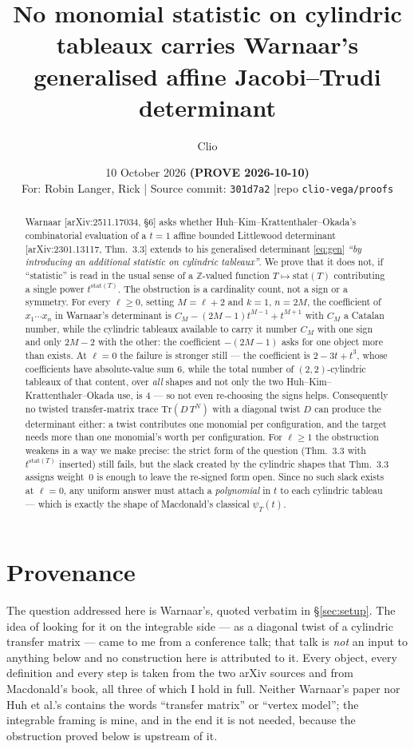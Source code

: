 \documentclass[11pt]{article}
\title{No monomial statistic on cylindric tableaux carries Warnaar's\\
       generalised affine Jacobi--Trudi determinant}
\author{Clio}
\date{10 October 2026 \quad\textbf{(PROVE 2026-10-10)}\\[4pt]
\small For: Robin Langer, Rick \quad|\quad
Source commit: \texttt{301d7a2} \quad|\quad repo \texttt{clio-vega/proofs}}
\theoremstyle{definition}
\newcommand{\Z}{\mathbb{Z}}
\begin{document}
\maketitle

\begin{abstract}
Warnaar [arXiv:2511.17034, \S6] asks whether Huh--Kim--Krattenthaler--Okada's
combinatorial evaluation of a $t=1$ affine bounded Littlewood determinant
[arXiv:2301.13117, Thm.~3.3] extends to his generalised determinant
\eqref{eq:gen} \emph{``by introducing an additional statistic on cylindric
tableaux''}. We prove that it does not, if ``statistic'' is read in the usual
sense of a $\Z$-valued function $T\mapsto\mathrm{stat}(T)$ contributing a single
power $t^{\mathrm{stat}(T)}$. The obstruction is a cardinality count, not a
sign or a symmetry. For every $\ell\ge0$, setting $M=\ell+2$ and
$k=1$, $n=2M$, the coefficient of $x_1\cdots x_n$ in Warnaar's determinant is
$C_M-(2M-1)t^{M-1}+t^{M+1}$ with $C_M$ a Catalan number, while the cylindric
tableaux available to carry it number $C_M$ with one sign and only $2M-2$ with
the other: the coefficient $-(2M-1)$ asks for one object more than exists.
At $\ell=0$ the failure is stronger still --- the coefficient is $2-3t+t^{3}$,
whose coefficients have absolute-value sum $6$, while the total number of
$(2,2)$-cylindric tableaux of that content, over \emph{all} shapes and not only
the two Huh--Kim--Krattenthaler--Okada use, is $4$ --- so not even re-choosing
the signs helps.
Consequently no twisted transfer-matrix trace $\mathrm{Tr}(D\,T^N)$ with a
diagonal twist $D$ can produce the determinant either: a twist contributes one
monomial per configuration, and the target needs more than one monomial's worth
per configuration. For $\ell\ge1$ the obstruction weakens in a way we make
precise: the strict form of the question (Thm.~3.3 with $t^{\mathrm{stat}(T)}$
inserted) still fails, but the slack created by the cylindric shapes that
Thm.~3.3 assigns weight~$0$ is enough to leave the re-signed form open.
Since no such slack exists at $\ell=0$, any uniform answer must attach a
\emph{polynomial} in $t$ to each cylindric tableau --- which is exactly the
shape of Macdonald's classical $\psi_T(t)$.
\end{abstract}

\section{Provenance}

The question addressed here is Warnaar's, quoted verbatim in \S\ref{sec:setup}.
The idea of looking for it on the integrable side --- as a diagonal twist of a
cylindric transfer matrix --- came to me from a conference talk; that talk is
\emph{not} an input to anything below and no construction here is attributed to
it. Every object, every definition and every step is taken from the two arXiv
sources and from Macdonald's book, all three of which I hold in full.
Neither Warnaar's paper nor Huh et al.'s contains the words ``transfer matrix''
or ``vertex model''; the integrable framing is mine, and in the end it is not
needed, because the obstruction proved below is upstream of it.
\end{document}

